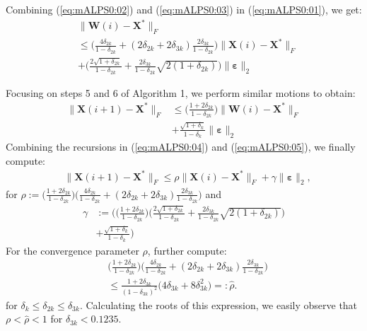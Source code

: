 \documentclass[twocolumn]{svjour3}
\newcommand{\vectornormbig}[1]{\big\|#1\big\|}
\newcommand{\signal}{\boldsymbol{X}}
\newcommand{\bestsignal}{\boldsymbol{X}^\ast}
\newcommand{\noise}{\boldsymbol{\varepsilon}}
\newcommand{\rank}{k}
\begin{document}
Combining (\ref{eq:mALPS0:02}) and (\ref{eq:mALPS0:03}) in (\ref{eq:mALPS0:01}), we get:
\begin{align}
&\vectornormbig{\boldsymbol{W}(i) - \bestsignal}_F \nonumber \\ &\leq \Big(\frac{4\delta_{2\rank}}{1-\delta_{2\rank}} + (2\delta_{2\rank} + 2\delta_{3\rank})\frac{2\delta_{3\rank}}{1-\delta_{2\rank}}\Big) \vectornormbig{\signal(i) - \bestsignal}_F \nonumber \\ &+ \Big(\frac{2\sqrt{1+\delta_{2\rank}}}{1 - \delta_{2\rank}} + \frac{2\delta_{3\rank}}{1-\delta_{2\rank}}  \sqrt{2(1+\delta_{2\rank})}\Big) \vectornormbig{\noise}_2 \label{eq:mALPS0:04}
\end{align}

Focusing on steps 5 and 6 of Algorithm 1, we perform similar motions to obtain:
\begin{align}
\vectornormbig{\signal(i+1) - \bestsignal}_F 
&\leq \Big( \frac{1 + 2\delta_{2\rank}}{1-\delta_{2\rank}}\Big)\vectornormbig{\boldsymbol{W}(i) - \bestsignal}_F \nonumber \\ &+ \frac{\sqrt{1+\delta_{\rank}}}{1-\delta_{\rank}} \vectornormbig{\noise}_2
\label{eq:mALPS0:05}
\end{align} 
Combining the recursions in (\ref{eq:mALPS0:04}) and (\ref{eq:mALPS0:05}), we finally compute:
\begin{align}
&\vectornormbig{\signal(i+1) - \bestsignal}_F \leq \rho\vectornormbig{\signal(i) - \bestsignal}_F + \gamma\vectornormbig{\noise}_2, \nonumber
\end{align} for $\rho:=\Big( \frac{1 + 2\delta_{2\rank}}{1-\delta_{2\rank}}\Big)\Big(\frac{4\delta_{2\rank}}{1-\delta_{2\rank}} + (2\delta_{2\rank} + 2\delta_{3\rank})\frac{2\delta_{3\rank}}{1-\delta_{2\rank}}\Big)$ and 
\begin{align}
\gamma &:= \Bigg(\Big( \frac{1 + 2\delta_{2\rank}}{1-\delta_{2\rank}}\Big)\Big(\frac{2\sqrt{1+\delta_{2\rank}}}{1 - \delta_{2\rank}} + \frac{2\delta_{3\rank}}{1-\delta_{2\rank}}  \sqrt{2(1+\delta_{2\rank})}\Big) \nonumber \\ &+ \frac{\sqrt{1+\delta_{\rank}}}{1-\delta_{\rank}} \Bigg) \nonumber
\end{align} For the convergence parameter $ \rho $, further compute:
\begin{align}
&\Big( \frac{1 + 2\delta_{2\rank}}{1-\delta_{2\rank}}\Big)\Big(\frac{4\delta_{2\rank}}{1-\delta_{2\rank}} + (2\delta_{2\rank} + 2\delta_{3\rank})\frac{2\delta_{3\rank}}{1-\delta_{2\rank}}\Big) \nonumber \\ &\leq \frac{1+2\delta_{3\rank}}{(1-\delta_{3\rank})^2} \big( 4\delta_{3\rank} + 8 \delta_{3\rank}^2\big) =: \hat{\rho}.
\end{align} for $ \delta_{\rank} \leq \delta_{2\rank} \leq \delta_{3\rank}$. Calculating the roots of this expression, we easily observe that $ \rho < \hat{\rho} < 1 $ for $ \delta_{3\rank} < 0.1235 $. 
\end{document}
